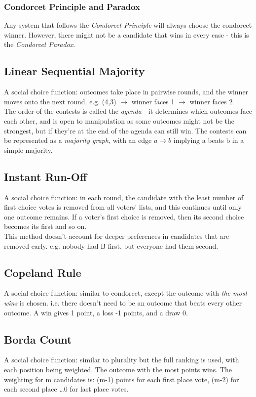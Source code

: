 \subsubsection{Condorcet Principle and Paradox}
Any system that follows the \emph{Condorcet Principle} will always choose the condorcet winner. However, there might not be a candidate that wins in every case - this is the \emph{Condorcet Paradox}.

\subsection{Linear Sequential Majority}
A social choice function: outcomes take place in pairwise rounds, and the winner moves onto the next round. e.g. (4,3) $\rightarrow$ winner faces 1 $\rightarrow$ winner faces 2 \\
The order of the contests is called the \emph{agenda} - it determines which outcomes face each other, and is open to manipulation as some outcomes might not be the strongest, but if they're at the end of the agenda can still win. The contests can be represented as a \emph{majority graph}, with an edge $a\rightarrow b$ implying a beats b in a simple majority. 

\subsection{Instant Run-Off}
A social choice function: in each round, the candidate with the least number of first choice votes is removed from all voters' lists, and this continues until only one outcome remains. If a voter's first choice is removed, then its second choice becomes its first and so on. \\
This method doesn't account for deeper preferences in candidates that are removed early. e.g. nobody had B first, but everyone had them second.

\subsection{Copeland Rule}
A social choice function: similar to condorcet, except the outcome with \emph{the most wins} is chosen. i.e. there doesn't need to be an outcome that beats every other outcome. A win gives 1 point, a loss -1 points, and a draw 0.

\subsection{Borda Count}
A social choice function: similar to plurality but the full ranking is used, with each position being weighted. The outcome with the most points wins. The weighting for m candidates is: (m-1) points for each first place vote, (m-2) for each second place \dots 0 for last place votes.

